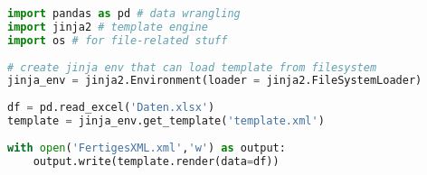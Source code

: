 \documentclass[12pt,ngerman]{scrartcl}
\begin{document}
\blindtext 

\begin{lstlisting}[language=Python]
import pandas as pd # data wrangling
import jinja2 # template engine
import os # for file-related stuff
 
# create jinja env that can load template from filesystem
jinja_env = jinja2.Environment(loader = jinja2.FileSystemLoader)
 
df = pd.read_excel('Daten.xlsx')
template = jinja_env.get_template('template.xml')
 
with open('FertigesXML.xml','w') as output:
    output.write(template.render(data=df))
\end{lstlisting}


\blindtext 
\end{document}
